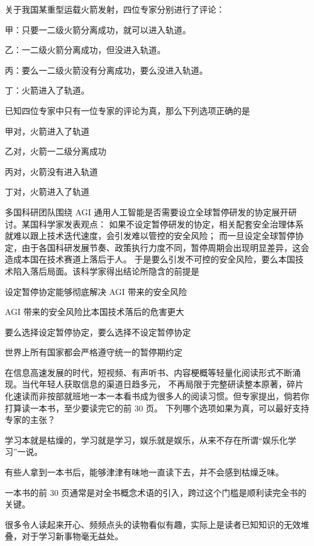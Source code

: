 \documentclass{exam-zh}
\begin{document}
\begin{question}
关于我国某重型运载火箭发射，四位专家分别进行了评论：

甲：只要一二级火箭分离成功，就可以进入轨道。

乙：一二级火箭分离成功，但没进入轨道。

丙：要么一二级火箭没有分离成功，要么没进入轨道。

丁：火箭进入了轨道。

已知四位专家中只有一位专家的评论为真，那么下列选项正确的是 \paren[]
\begin{choices}
  \item 甲对，火箭进入了轨道
  \item 乙对，火箭一二级分离成功
  \item 丙对，火箭没有进入轨道
  \item 丁对，火箭进入了轨道
\end{choices}
\end{question}

\begin{question}
多国科研团队围绕 AGI 通用人工智能是否需要设立全球暂停研发的协定展开研讨。某国科学家发表观点：
如果不设定暂停研发的协定，相关配套安全治理体系就难以跟上技术迭代速度，会引发难以管控的安全风险；
而一旦设定全球暂停协定，由于各国科研发展节奏、政策执行力度不同，暂停周期会出现明显差异，这会造成本国在技术赛道上落后于人。
于是要么引发不可控的安全风险，要么本国技术陷入落后局面。该科学家得出结论所隐含的前提是 \paren[]
\begin{choices}
  \item 设定暂停协定能够彻底解决 AGI 带来的安全风险
  \item AGI 带来的安全风险比本国技术落后的危害更大
  \item 要么选择设定暂停协定，要么选择不设定暂停协定
  \item 世界上所有国家都会严格遵守统一的暂停期约定
\end{choices}
\end{question}

\begin{question}
在信息高速发展的时代，短视频、有声听书、内容梗概等轻量化阅读形式不断涌现。当代年轻人获取信息的渠道日趋多元，
不再局限于完整研读整本原著，碎片化速读而非按部就班地一本一本看书成为很多人的阅读习惯。但专家提出，倘若你打算读一本书，至少要读完它的前 $30$ 页。
下列哪个选项如果为真，可以最好支持专家的主张？\paren[]
\begin{choices}
  \item 学习本就是枯燥的，学习就是学习，娱乐就是娱乐，从来不存在所谓“娱乐化学习”一说。
  \item 有些人拿到一本书后，能够津津有味地一直读下去，并不会感到枯燥乏味。
  \item 一本书的前 $30$ 页通常是对全书概念术语的引入，跨过这个门槛是顺利读完全书的关键。
  \item 很多令人读起来开心、频频点头的读物看似有趣，实际上是读者已知知识的无效堆叠，对于学习新事物毫无益处。
\end{choices}
\end{question}
\end{document}
